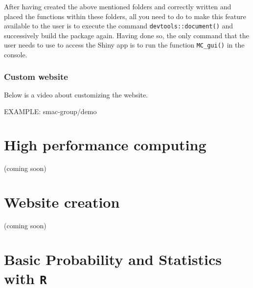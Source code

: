 \documentclass[12pt,]{krantz}
\begin{document}
After having created the above mentioned folders and correctly written
and placed the functions within these folders, all you need to do to
make this feature available to the user is to execute the command
\texttt{devtools::document()} and successively build the package again.
Having done so, the only command that the user needs to use to access
the Shiny app is to run the function \texttt{MC\_gui()} in the console.

\subsection{Custom website}\label{custom-website}

Below is a video about customizing the website.

EXAMPLE: smac-group/demo

\chapter{High performance computing}\label{high-performance-computing}

(coming soon)

\chapter{Website creation}\label{website-creation}

(coming soon)

\appendix {}


\chapter{\texorpdfstring{Basic Probability and Statistics with
\texttt{R}}{Basic Probability and Statistics with R}}\label{basic-probability-and-statistics-with-r-1}



\backmatter
\printindex
\end{document}
